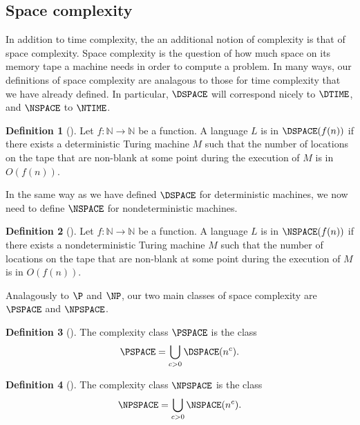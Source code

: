 \documentclass[english]{reedthesis}
\theoremstyle{plain}
\theoremstyle{definition}
\newtheorem{defn}[defn]{Definition}
\theoremstyle{remark}
\begin{document}
\subsection{Space complexity}

In addition to time complexity, the an additional notion of complexity is that
of space complexity. Space complexity is the question of how much space on its
memory tape a machine needs in order to compute a problem. In many ways, our
definitions of space complexity are analagous to those for time complexity that
we have already defined. In particular, $\DSPACE$ will correspond nicely to
$\DTIME$, and $\NSPACE$ to $\NTIME$.

\begin{defn}[{\cite[Def.\ 4.1]{AB09}}]\label{def:dspace}
  Let $f: \mathbb{N} \rightarrow \mathbb{N}$ be a function. A language $L$ is in $\DSPACE(f(n))$ if there
  exists a deterministic Turing machine $M$ such that the number of locations on
  the tape that are non-blank at some point during the execution of $M$ is
  in $O(f(n))$.
\end{defn}

In the same way as we have defined $\DSPACE$ for deterministic machines, we now
need to define $\NSPACE$ for nondeterministic machines.

\begin{defn}[{\cite[Def. 4.1]{AB09}}]\label{def:nspace}
  Let $f: \mathbb{N} \rightarrow \mathbb{N}$ be a function. A language $L$ is in $\NSPACE(f(n))$ if there
  exists a nondeterministic Turing machine $M$ such that the number of locations
  on the tape that are non-blank at some point during the execution of $M$ is in
  $O(f(n))$.
\end{defn}

Analagously to $\P$ and $\NP$, our two main classes of space complexity are
$\PSPACE$ and $\NPSPACE$.

\begin{defn}[{\cite[Def.\ 4.5]{AB09}}]\label{def:pspace}
  The complexity class $\PSPACE$ is the class
  \[
    \PSPACE = \bigcup_{c > 0}\DSPACE(n^{c}).
  \]
\end{defn}

\begin{defn}[{\cite[Def.\ 4.5]{AB09}}]\label{def:npspace}
  The complexity class $\NPSPACE$ is the class
  \[
    \NPSPACE = \bigcup_{c > 0}\NSPACE(n^{c}).
  \]
\end{defn}
\end{document}
